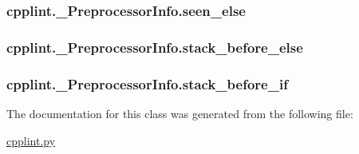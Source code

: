 \subsubsection[{\texorpdfstring{seen\+\_\+else}{seen_else}}]{\setlength{\rightskip}{0pt plus 5cm}cpplint.\+\_\+\+Preprocessor\+Info.\+seen\+\_\+else}\hypertarget{classcpplint_1_1__PreprocessorInfo_a7587e84a1e6db34c3c94317f5a5931cc}{}\label{classcpplint_1_1__PreprocessorInfo_a7587e84a1e6db34c3c94317f5a5931cc}
\subsubsection[{\texorpdfstring{stack\+\_\+before\+\_\+else}{stack_before_else}}]{\setlength{\rightskip}{0pt plus 5cm}cpplint.\+\_\+\+Preprocessor\+Info.\+stack\+\_\+before\+\_\+else}\hypertarget{classcpplint_1_1__PreprocessorInfo_a34a80f1f97808614b7062ba1e5bbf2b9}{}\label{classcpplint_1_1__PreprocessorInfo_a34a80f1f97808614b7062ba1e5bbf2b9}
\subsubsection[{\texorpdfstring{stack\+\_\+before\+\_\+if}{stack_before_if}}]{\setlength{\rightskip}{0pt plus 5cm}cpplint.\+\_\+\+Preprocessor\+Info.\+stack\+\_\+before\+\_\+if}\hypertarget{classcpplint_1_1__PreprocessorInfo_a0681b2adca3171a495fc1eca43d245c0}{}\label{classcpplint_1_1__PreprocessorInfo_a0681b2adca3171a495fc1eca43d245c0}


The documentation for this class was generated from the following file\+:\begin{DoxyCompactItemize}
\item 
\hyperlink{cpplint_8py}{cpplint.\+py}\end{DoxyCompactItemize}
